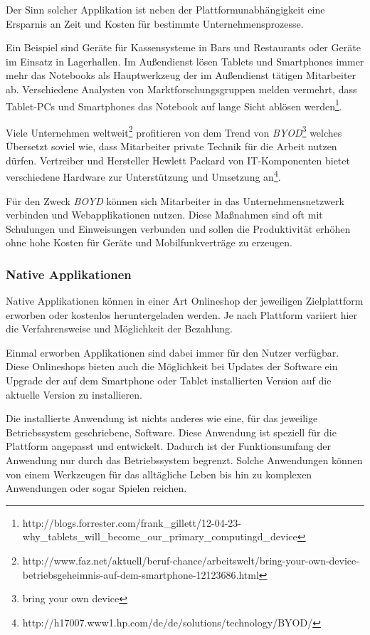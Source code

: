Der Sinn solcher Applikation ist neben der Plattformunabhängigkeit eine Ersparnis an Zeit und Kosten für bestimmte Unternehmensprozesse.

Ein Beispiel sind Geräte für Kassensysteme in Bars und Restaurants oder Geräte im Einsatz in Lagerhallen. Im Außendienst lösen Tablets und Smartphones immer mehr das Notebooks als Hauptwerkzeug der im Außendienst tätigen Mitarbeiter ab. Verschiedene Analysten von Marktforschungsgruppen melden vermehrt, dass Tablet-PCs und Smartphones das Notebook auf lange Sicht ablösen werden\footnote{http://blogs.forrester.com/frank\_gillett/12-04-23-why\_tablets\_will\_become\_our\_primary\_computingd\_device}.

Viele Unternehmen weltweit\footnote{http://www.faz.net/aktuell/beruf-chance/arbeitswelt/bring-your-own-device-betriebsgeheimnis-auf-dem-smartphone-12123686.html} profitieren von dem Trend von \textit{BYOD}\footnote{bring your own device} welches Übersetzt soviel wie, dass Mitarbeiter private Technik für die Arbeit nutzen dürfen. Vertreiber und Hersteller Hewlett Packard von IT-Komponenten bietet verschiedene Hardware zur Unterstützung und Umsetzung an\footnote{http://h17007.www1.hp.com/de/de/solutions/technology/BYOD/}.

 Für den Zweck \textit{BOYD} können sich Mitarbeiter in das Unternehmensnetzwerk verbinden und Webapplikationen nutzen. Diese Maßnahmen sind oft mit Schulungen und Einweisungen verbunden und sollen die Produktivität erhöhen ohne hohe Kosten für Geräte und Mobilfunkverträge zu erzeugen.

\subsubsection{Native Applikationen}
\label{natand}

Native Applikationen können in einer Art Onlineshop der jeweiligen Zielplattform erworben oder kostenlos heruntergeladen werden. Je nach Plattform variiert hier die Verfahrensweise und Möglichkeit der Bezahlung.

Einmal erworben Applikationen sind dabei immer für den Nutzer verfügbar. Diese Onlineshops bieten auch die Möglichkeit bei Updates der Software ein Upgrade der auf dem Smartphone oder Tablet installierten Version auf die aktuelle Version zu installieren.

Die installierte Anwendung ist nichts anderes wie eine, für das jeweilige Betriebssystem geschriebene, Software. Diese Anwendung ist speziell für die Plattform angepasst und entwickelt. Dadurch ist der Funktionsumfang der Anwendung nur durch das Betriebssystem begrenzt. Solche Anwendungen können von einem Werkzeugen für das alltägliche Leben bis hin zu komplexen Anwendungen oder sogar Spielen reichen.

